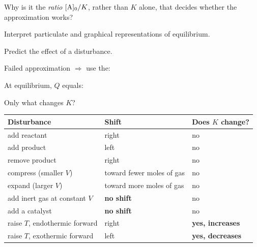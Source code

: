 \documentclass{apchem-notes}
\begin{document}
\begin{exitticket}
Why is it the \emph{ratio} $[\ce{A}]_0/K$, rather than $K$ alone, that
decides whether the approximation works?
\end{exitticket}


\begin{objectives}
  \item Interpret particulate and graphical representations of equilibrium.
  \item Predict the effect of a disturbance.
\end{objectives}


\begin{warmup}[3]
  \item Failed approximation $\Rightarrow$ use the:
  \item At equilibrium, $Q$ equals: 
  \item Only what changes $K$? 
\end{warmup}



\begin{center}
\renewcommand{\arraystretch}{1.25}
\begin{tabular}{@{}lll@{}}
\hline
\textbf{Disturbance} & \textbf{Shift} & \textbf{Does $K$ change?} \\
\hline
add reactant & right & no \\
add product & left & no \\
remove product & right & no \\
compress (smaller $V$) & toward fewer moles of gas & no \\
expand (larger $V$) & toward more moles of gas & no \\
add inert gas at constant $V$ & \textbf{no shift} & no \\
add a catalyst & \textbf{no shift} & no \\
raise $T$, endothermic forward & right & \textbf{yes, increases} \\
raise $T$, exothermic forward & left & \textbf{yes, decreases} \\
\hline
\end{tabular}
\end{center}
\end{document}
